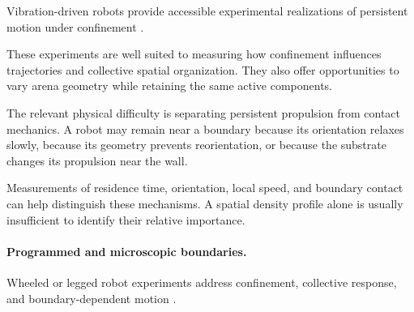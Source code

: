 Vibration-driven robots
provide accessible
experimental realizations
of persistent motion
under confinement
\cite{Deblais2019howtoforceanarmy,Balda2022playingwithactive,Xi2024emergentintelligenc,Mohanty2025multimodalmotionan,Edwards2026robusttopologically,Hoek2026pistonlikeinformat,Smith2026fromswarmtoindivi,Titov2025differentialequatio,Escobar2025effectofparticlec,VidalesHernndez2026onthemotionofsel,Boudet2025nonmarkoviandynami,Xi2024emergentbehaviorso,Giomi2013swarmingswirlinga,Molodtsova2025micellizationinact,Musacchio2026fluidizationinduced,Deblais2018boundariescontrolc,Dmitriev2025swarmodroidandampy,Miyashita2007selfassembleofwat,Callegari2023playingwithactive,Balda2024playingwithactive,Siebers2023exploitingcompositi,Son2024emergentfunctional,Boudet2021fromcollectionsof,Zion2023morphologicalcomput,Li2013asymmetricgearrect,Wagner2026geometryinducedtra,Lvay2026collectivedynamics,Zion2021distributedonline}.

These experiments are
well suited to measuring
how confinement influences
trajectories and
collective spatial
organization.
They also offer
opportunities to
vary arena geometry
while retaining
the same active
components.

The relevant physical
difficulty is separating
persistent propulsion
from contact mechanics.
A robot may remain
near a boundary
because its orientation
relaxes slowly,
because its geometry
prevents reorientation,
or because the substrate
changes its propulsion
near the wall.

Measurements of
residence time,
orientation,
local speed,
and boundary
contact can help
distinguish these
mechanisms.
A spatial density
profile alone is
usually insufficient
to identify
their relative
importance.

\paragraph*{Programmed and microscopic boundaries.}

Wheeled or legged
robot experiments
address confinement,
collective response,
and boundary-dependent
motion
\cite{Giardina2022collectivephototact,Zhang2026emergentnonhermiti,Lee2022distributedcohesive,Cazenille2016automatedcalibratio,OrdazRivas2021flockofrobotswith,Mendiburu2022automodemateautom,Li2022fieldmediatedlocom,Liu2023orderlyhysteresisi,Liu2025collectivemotionmo,Liu2020computationalandro,Barone2024experimentalandnum,Fine2013elicitingcollective,Hart2022unifyingcontrolarc,Kernbach2013adaptivecollective,Sun2023translatingvirtual,Prasath2022dynamicsofcooperat,Li2020selfpropulsiononsb}.

